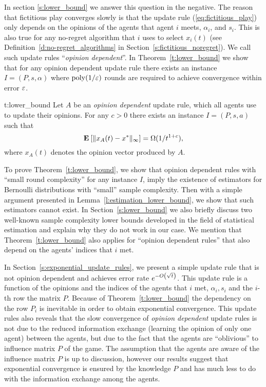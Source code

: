 In section \ref{s:lower_bound} we answer this question in the negative.
The reason that fictitious play converges slowly is that
the update rule (\ref{eq:fictitious_play})
only depends on the opinions of the agents that agent $i$ meets,
$\alpha_i$, and $s_i$. This is also true for any no-regret algorithm
that $i$ uses to select $x_i(t)$ (see Definition~\ref{d:no-regret_algorithms}
in Section~\ref{s:fictitious_noregret}).
We call such update rules \enquote{\emph{opinion dependent}}.
In Theorem~\ref{t:lower_bound} we
show that for any opinion dependent update rule there exists an instance
$I = (P,s,\alpha)$ where $\mathrm{poly}(1/\varepsilon)$ rounds are required to
achieve convergence within error $\varepsilon$.
\begin{reptheorem}{t:lower_bound}
  Let $A$ be an \emph{opinion dependent} update rule, which all
  agents use to update their opinions.
  For any $c>0$ there exists an instance $I=(P,s,a)$ such that
  \[
    \Exp{\norm{\infty}{x_A(t) - x^*}} = \Omega(1/t^{1+c}),
  \]
  where $x_A(t)$ denotes the opinion vector produced by $A$.
\end{reptheorem}
%
To prove Theorem~\ref{t:lower_bound}, we show that opinion dependent rules with
\enquote{small round complexity} for any instance $I$, imply the existence
of estimators for Bernoulli distributions with
\enquote{small} sample complexity. Then with a simple argument
presented in Lemma~\ref{l:estimation_lower_bound},
we show that such estimators cannot exist.
In Section~\ref{s:lower_bound} we also
briefly discuss two well-known sample complexity lower bounds developed in the field of
statistical estimation and explain why they do not work in our case.
We mention that Theorem~\ref{t:lower_bound} also applies for
\enquote{opinion dependent rules} that also depend on the agents' indices
that $i$ met.

In Section~\ref{s:exponential_update_rules}, we present a simple update rule that
is not opinion dependent and  achieves error rate $e^{-O\left(\sqrt{t}\right)}$.
This update rule is a function of the opinions and the indices of the agents
that $i$ met, $\alpha_i,s_i$ and the $i$-th row the matrix $P$. Because of
Theorem~\ref{t:lower_bound} the dependency on the row $P_i$ is inevitable in
order to obtain exponential convergence.  This update rules also reveals that
the slow convergence of \emph{opinion dependent} update rules is not due to
the reduced information exchange (learning the opinion of only one agent)
between the agents, but due to the fact that the agents are \enquote{oblivious}
to influence matrix $P$ of the game. The assumption that the agents are aware of
the influence matrix $P$ is up to discussion, however our results suggest that
exponential convergence is ensured by the knowledge $P$ and has much less
to do with the information exchange among the agents.

